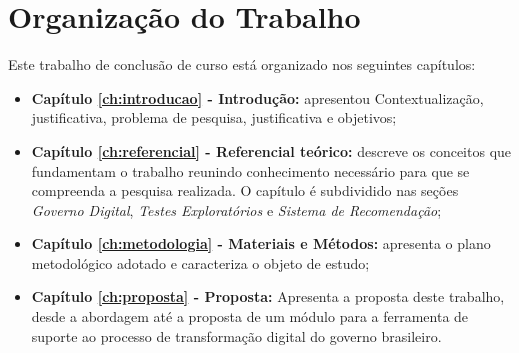 \section{Organização do Trabalho}

Este trabalho de conclusão de curso está organizado nos seguintes capítulos:

\begin{itemize}
    \item \textbf{Capítulo \ref{ch:introducao} - Introdução:} apresentou Contextualização, justificativa, problema de pesquisa, justificativa e objetivos;
    \item \textbf{Capítulo \ref{ch:referencial} - Referencial teórico:} descreve os conceitos que fundamentam o trabalho reunindo conhecimento necessário para que se compreenda a pesquisa realizada. O capítulo é subdividido nas seções \textit{Governo Digital}, \textit{Testes Exploratórios} e \textit{Sistema de Recomendação};
     \item \textbf{Capítulo \ref{ch:metodologia} - Materiais e Métodos:} apresenta o plano metodológico adotado e caracteriza o objeto de estudo;
     \item \textbf{Capítulo \ref{ch:proposta} - Proposta:} Apresenta a proposta deste trabalho, desde a abordagem até a proposta de um módulo para a ferramenta de suporte ao processo de transformação digital do governo brasileiro.
     
    
\end{itemize}
